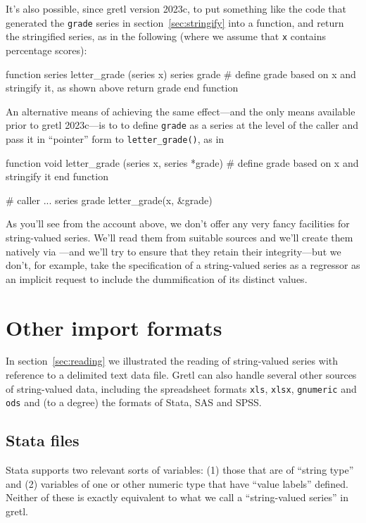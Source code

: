 It's also possible, since gretl version 2023c, to put something like
the code that generated the \texttt{grade} series in
section~\ref{sec:stringify} into a function, and return the
stringified series, as in the following (where we assume that
\texttt{x} contains percentage scores):
\begin{code}
function series letter_grade (series x)
  series grade
  # define grade based on x and stringify it, as shown above
  return grade
end function
\end{code}
%
An alternative means of achieving the same effect---and the only means
available prior to gretl 2023c---is to to define \texttt{grade} as a
series at the level of the caller and pass it in ``pointer'' form to
\verb|letter_grade()|, as in
%
\begin{code}
function void letter_grade (series x, series *grade)
  # define grade based on x and stringify it
end function

# caller
...
series grade
letter_grade(x, &grade)
\end{code}

As you'll see from the account above, we don't offer any very fancy
facilities for string-valued series. We'll read them from suitable
sources and we'll create them natively via ---and
we'll try to ensure that they retain their integrity---but we don't,
for example, take the specification of a string-valued series as a
regressor as an implicit request to include the dummification of its
distinct values.

\section{Other import formats}
\label{sec:other-imports}

In section~\ref{sec:reading} we illustrated the reading of
string-valued series with reference to a delimited text data
file. Gretl can also handle several other sources of string-valued
data, including the spreadsheet formats \texttt{xls}, \texttt{xlsx},
\texttt{gnumeric} and \texttt{ods} and (to a degree) the formats of
\textsf{Stata}, \textsf{SAS} and \textsf{SPSS}.

\subsection{Stata files}

Stata supports two relevant sorts of variables: (1) those that are of
``string type'' and (2) variables of one or other numeric type that
have ``value labels'' defined. Neither of these is exactly equivalent
to what we call a ``string-valued series'' in gretl.

